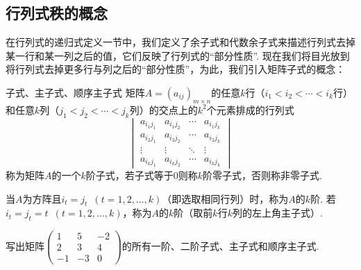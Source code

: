 \subsection{行列式秩的概念}

在行列式的递归式定义一节中，我们定义了余子式和代数余子式来描述行列式去掉某一行和某一列之后的值，它们反映了行列式的``部分性质''. 现在我们将目光放到将行列式去掉更多行与列之后的``部分性质''，为此，我们引入矩阵子式的概念：

\begin{definition}{}{子式、主子式、顺序主子式}
    矩阵$A=(a_{ij})_{m \times n}$的任意$k$行（$i_1<i_2<\cdots<i_k$行）和任意$k$列（$j_1<j_2<\cdots<j_k$列）的交点上的$k^2$个元素排成的行列式
    \[\begin{vmatrix}
            a_{i_1j_1} & a_{i_1j_2} & \cdots & a_{i_1j_k} \\
            a_{i_2j_1} & a_{i_2j_2} & \cdots & a_{i_2j_k} \\
            \vdots     & \vdots     & \ddots & \vdots     \\
            a_{i_kj_1} & a_{i_kj_2} & \cdots & a_{i_kj_k}
        \end{vmatrix}\]
    称为矩阵$A$的一个$k$阶子式，若子式等于0则称$k$阶零子式，否则称非零子式.

    当$A$为方阵且$i_t=j_t\enspace(t=1,2,\ldots,k)$（即选取相同行列）时，称为$A$的$k$阶. 若$i_t=j_t=t\enspace(t=1,2,\ldots,k)$，称为$A$的$k$阶（取前$k$行$k$列的左上角主子式）.
\end{definition}

\begin{example}{}{}
    写出矩阵$\begin{pmatrix}
            1 & 5 & -2 \\ 2 & 3 & 4 \\ -1 & -3 & 0
        \end{pmatrix}$的所有一阶、二阶子式、主子式和顺序主子式.
\end{example}

